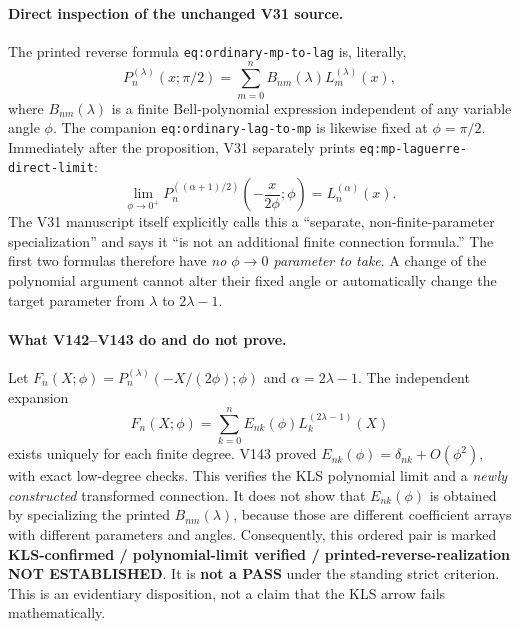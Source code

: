 \documentclass[11pt]{article}
\begin{document}
\paragraph{Direct inspection of the unchanged V31 source.}
The printed reverse formula \texttt{eq:ordinary-mp-to-lag} is, literally,
\[
 P_n^{(\lambda)}(x;\pi/2)=\sum_{m=0}^n B_{nm}(\lambda)
 L_m^{(\lambda)}(x),
\]
where $B_{nm}(\lambda)$ is a finite Bell-polynomial expression independent of any variable angle $\phi$. The companion \texttt{eq:ordinary-lag-to-mp} is likewise fixed at $\phi=\pi/2$. Immediately after the proposition, V31 separately prints \texttt{eq:mp-laguerre-direct-limit}:
\[
 \lim_{\phi\to0^+}P_n^{((\alpha+1)/2)}
 \left(-\frac{x}{2\phi};\phi\right)=L_n^{(\alpha)}(x).
\]
The V31 manuscript itself explicitly calls this a ``separate, non-finite-parameter specialization'' and says it ``is not an additional finite connection formula.'' The first two formulas therefore have \emph{no $\phi\to0$ parameter to take}. A change of the polynomial argument cannot alter their fixed angle or automatically change the target parameter from $\lambda$ to $2\lambda-1$.

\paragraph{What V142--V143 do and do not prove.}
Let $F_n(X;\phi)=P_n^{(\lambda)}(-X/(2\phi);\phi)$ and $\alpha=2\lambda-1$. The independent expansion
\[
 F_n(X;\phi)=\sum_{k=0}^n E_{nk}(\phi)L_k^{(2\lambda-1)}(X)
\]
exists uniquely for each finite degree. V143 proved $E_{nk}(\phi)=\delta_{nk}+O(\phi^2)$, with exact low-degree checks. This verifies the KLS polynomial limit and a \emph{newly constructed} transformed connection. It does not show that $E_{nk}(\phi)$ is obtained by specializing the printed $B_{nm}(\lambda)$, because those are different coefficient arrays with different parameters and angles. Consequently, this ordered pair is marked \textbf{KLS-confirmed / polynomial-limit verified / printed-reverse-realization NOT ESTABLISHED}. It is \textbf{not a PASS} under the standing strict criterion. This is an evidentiary disposition, not a claim that the KLS arrow fails mathematically.
\end{document}
